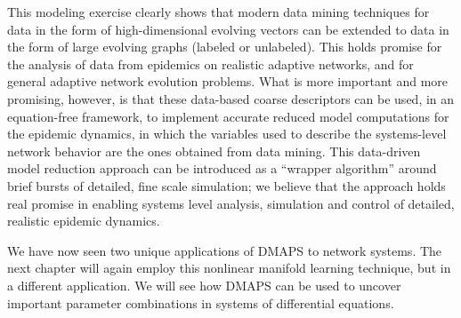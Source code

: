 This modeling exercise clearly shows that modern data mining
techniques for data in the form of high-dimensional evolving vectors
can be extended to data in the form of large evolving graphs (labeled
or unlabeled). This holds promise for the analysis of data from
epidemics on realistic adaptive networks, and for general adaptive
network evolution problems. What is more important and more promising,
however, is that these data-based coarse descriptors can be used, in
an equation-free framework, to implement accurate reduced model
computations for the epidemic dynamics, in which the variables used to
describe the systems-level network behavior are the ones obtained from
data mining. This data-driven model reduction approach can be
introduced as a “wrapper algorithm” around brief bursts of detailed,
fine scale simulation; we believe that the approach holds real promise
in enabling systems level analysis, simulation and control of
detailed, realistic epidemic dynamics.

We have now seen two unique applications of DMAPS to network
systems. The next chapter will again employ this nonlinear manifold
learning technique, but in a different application. We will see how
DMAPS can be used to uncover important parameter combinations in
systems of differential equations.



